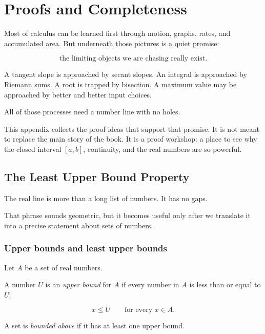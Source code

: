 
\chapter{Proofs and Completeness}
\label{app:proofs-completeness}

Most of calculus can be learned first through motion, graphs, rates, and accumulated
area.  But underneath those pictures is a quiet promise:

\[
\boxed{
\text{the limiting objects we are chasing really exist.}
}
\]

A tangent slope is approached by secant slopes.  An integral is approached by Riemann
sums.  A root is trapped by bisection.  A maximum value may be approached by better
and better input choices.

All of those processes need a number line with no holes.

This appendix collects the proof ideas that support that promise.  It is not meant to
replace the main story of the book.  It is a proof workshop: a place to see why the
closed interval \([a,b]\), continuity, and the real numbers are so powerful.

\section{The Least Upper Bound Property}
\label{appsec:least-upper-bound-property}

The real line is more than a long list of numbers.  It has no gaps.

That phrase sounds geometric, but it becomes useful only after we translate it into a
precise statement about sets of numbers.

\subsection{Upper bounds and least upper bounds}
\label{appsubsec:upper-bounds-suprema}

Let \(A\) be a set of real numbers.

A number \(U\) is an \emph{upper bound} for \(A\) if every number in \(A\) is less than
or equal to \(U\):

\[
x\le U
\qquad\text{for every }x\in A.
\]

A set is \emph{bounded above} if it has at least one upper bound.

